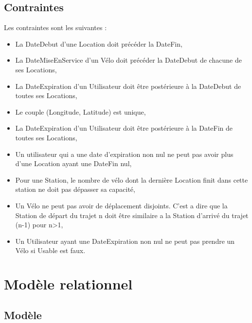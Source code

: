 \documentclass[a4paper,10pt]{article}
\begin{document}
\subsection{Contraintes}
Les contraintes sont les suivantes :
\begin{itemize}
  \item La DateDebut d'une Location doit précéder la DateFin, 
  \item La DateMiseEnService d'un Vélo doit précéder la DateDebut de chacune de ses Locations,
  \item La DateExpiration d'un Utilisateur doit \^etre postérieure à la DateDebut de toutes ses Locations,
  \item Le couple (Longitude, Latitude) est unique,
  \item La DateExpiration d'un Utilisateur doit \^etre postérieure à la DateFin de toutes ses Locations,
  \item Un utilisateur qui a une date d'expiration non nul ne peut pas avoir plus d'une Location ayant une DateFin nul,
  \item Pour une Station, le nombre de vélo dont la dernière Location finit  dans cette station ne doit pas dépasser sa capacité,
  \item Un Vélo ne peut pas avoir de déplacement disjoints. C'est a dire que la Station de départ du trajet n doit \^etre similaire a la Station d'arrivé du trajet (n-1) pour n>1,
  \item Un Utilisateur ayant une DateExpiration non nul ne peut pas prendre un Vélo si Usable est faux.
\end{itemize}



\section{Modèle relationnel}
\subsection{Modèle}
\end{document}
